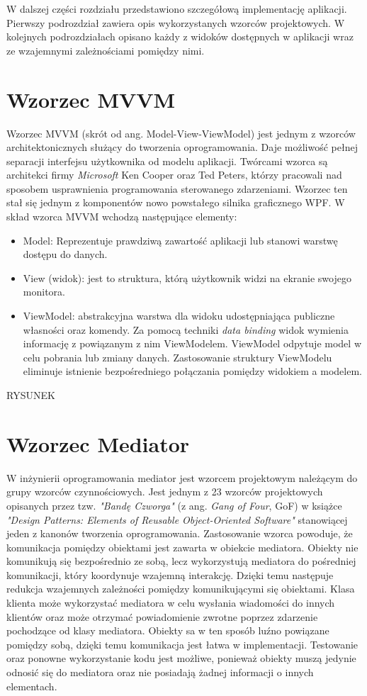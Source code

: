 W dalszej części rozdziału przedstawiono szczegółową implementację aplikacji. Pierwszy podrozdział zawiera opis wykorzystanych wzorców projektowych. W kolejnych podrozdziałach opisano każdy z widoków dostępnych w aplikacji wraz ze wzajemnymi zależnościami pomiędzy nimi.

\section{Wzorzec MVVM}
Wzorzec MVVM (skrót od ang. Model-View-ViewModel) jest jednym z wzorców architektonicznych służący do tworzenia oprogramowania. Daje możliwość pełnej separacji interfejsu użytkownika od modelu aplikacji. Twórcami wzorca są architekci firmy \textit{Microsoft} Ken Cooper oraz Ted Peters, którzy pracowali nad sposobem usprawnienia programowania sterowanego zdarzeniami. Wzorzec ten stał się jednym z komponentów nowo powstałego silnika graficznego WPF. 
W skład wzorca MVVM wchodzą następujące elementy:
\begin{itemize}
	\item Model: Reprezentuje prawdziwą zawartość aplikacji lub stanowi warstwę dostępu do danych.
	\item View (widok): jest to struktura, którą użytkownik widzi na ekranie swojego monitora.
	\item ViewModel: abstrakcyjna warstwa dla widoku udostępniająca publiczne własności oraz komendy. Za pomocą techniki \textit{data binding} widok wymienia informację z powiązanym z nim ViewModelem. ViewModel odpytuje model w celu pobrania lub zmiany danych. Zastosowanie struktury ViewModelu eliminuje istnienie bezpośredniego połączania pomiędzy widokiem a modelem.
\end{itemize}
RYSUNEK

\section{Wzorzec Mediator}
\label{sec: mediator}
W inżynierii oprogramowania mediator jest wzorcem projektowym należącym do grupy wzorców czynnościowych. Jest jednym z 23 wzorców projektowych opisanych przez tzw. \textit{"Bandę Czworga"} (z ang. \textit{Gang of Four}, GoF) w książce \textit{"Design Patterns: Elements of Reusable Object-Oriented Software"} stanowiącej jeden z kanonów tworzenia oprogramowania. Zastosowanie wzorca powoduje, że komunikacja pomiędzy obiektami jest zawarta w obiekcie mediatora. Obiekty nie komunikują się bezpośrednio ze sobą, lecz wykorzystują mediatora do pośredniej komunikacji, który koordynuje wzajemną interakcję.  Dzięki temu następuje redukcja wzajemnych zależności pomiędzy komunikującymi się obiektami. Klasa klienta może wykorzystać mediatora w celu wysłania wiadomości do innych klientów oraz może otrzymać powiadomienie zwrotne poprzez zdarzenie pochodzące od klasy mediatora. Obiekty sa w ten sposób luźno powiązane pomiędzy sobą, dzięki temu komunikacja jest łatwa w implementacji. Testowanie oraz ponowne wykorzystanie kodu jest możliwe, ponieważ obiekty muszą jedynie odnosić się do mediatora oraz nie posiadają żadnej informacji o innych elementach.

